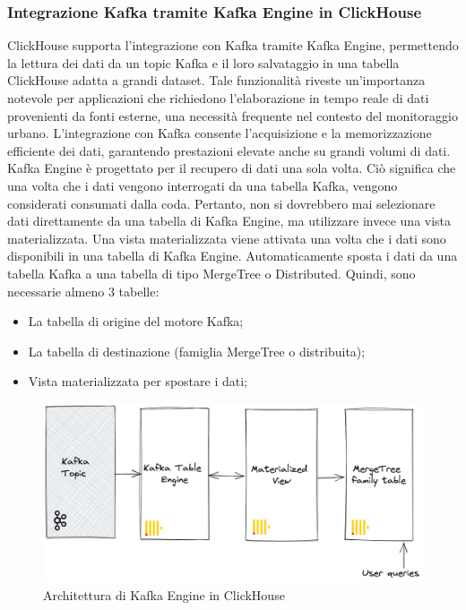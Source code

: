 \subsubsection{Integrazione Kafka tramite Kafka Engine in ClickHouse}\label{sec:kafka_engine}
ClickHouse supporta l'integrazione con Kafka tramite Kafka Engine, permettendo la lettura dei dati da un topic Kafka e il loro salvataggio in una tabella ClickHouse adatta a grandi dataset. Tale funzionalità riveste un'importanza notevole per applicazioni che richiedono l'elaborazione in tempo reale di dati provenienti da fonti esterne, una necessità frequente nel contesto del monitoraggio urbano. L'integrazione con Kafka consente l'acquisizione e la memorizzazione efficiente dei dati, garantendo prestazioni elevate anche su grandi volumi di dati.\\
Kafka Engine è progettato per il recupero di dati una sola volta. Ciò significa che una volta che i dati vengono interrogati da una tabella Kafka, vengono considerati consumati dalla coda. Pertanto, non si dovrebbero mai selezionare dati direttamente da una tabella di Kafka Engine, ma utilizzare invece una vista materializzata. Una vista materializzata viene attivata una volta che i dati sono disponibili in una tabella di Kafka Engine. Automaticamente sposta i dati da una tabella Kafka a una tabella di tipo MergeTree o Distributed. Quindi, sono necessarie almeno 3 tabelle:
\begin{itemize}
  \item La tabella di origine del motore Kafka;
  \item La tabella di destinazione (famiglia MergeTree o distribuita);
  \item Vista materializzata per spostare i dati;
\end{itemize}
\begin{figure}[H]
  \centering
  \includegraphics[width=.7\textwidth]{../Images/SpecificaTecnica/kafka_engine_architecture.png}
  \caption{Architettura di Kafka Engine in ClickHouse}
  \label{fig:Architettura_kafka_engine}
\end{figure}

